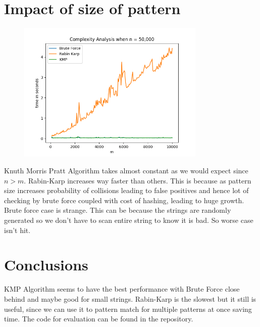 \documentclass[a4paper, 12pt]{report}
\begin{document}
    \section{Impact of size of pattern}
\begin{figure}[H]
        \centering
        \includegraphics[width=0.8\textwidth]{m_analysis.png}
    \end{figure}
    Knuth Morris Pratt Algorithm takes almost constant as we would expect since $n>m$. Rabin-Karp increases way faster than others. This is because as pattern size increases probability of collisions leading to false positives and hence lot of checking by brute force coupled with cost of hashing, leading to huge growth. Brute force case is strange. This can be because the strings are randomly generated so we don’t have to scan entire string to know it is bad. So worse case isn’t hit.
    
\section{Conclusions}
    KMP Algorithm seems to have the best performance with Brute Force close behind and maybe good for small strings. Rabin-Karp is the slowest but it still is useful, since we can use it to pattern match for multiple patterns at once saving time. The code for evaluation can be found in the repository.
    \printbibliography  
\end{document}
